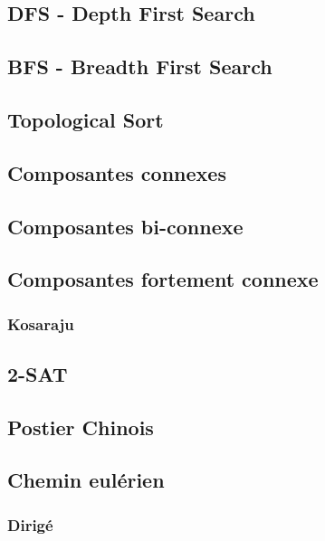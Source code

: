 \documentclass[8pt]{article}
\begin{document}
        \subsection{DFS - Depth First Search}
        {\scriptsize}
        \subsection{BFS - Breadth First Search}
        {\scriptsize}
        \subsection{Topological Sort}
        {\scriptsize}
        \subsection{Composantes connexes}
        \subsection{Composantes bi-connexe}
        {\scriptsize}
        \subsection{Composantes fortement connexe}
            \subsubsection{Kosaraju}
            {\scriptsize}
        \subsection{2-SAT}
        {\scriptsize}
        \subsection{Postier Chinois}
        \subsection{Chemin eulérien}
            \subsubsection{Dirigé}
            {\scriptsize}
\end{document}
